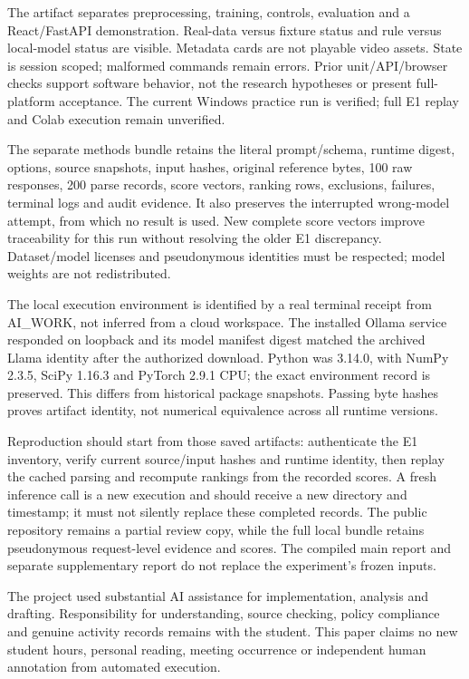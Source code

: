 \documentclass[conference]{IEEEtran}
\begin{document}
The artifact separates preprocessing, training, controls, evaluation and a React/FastAPI demonstration. Real-data versus fixture status and rule versus local-model status are visible. Metadata cards are not playable video assets. State is session scoped; malformed commands remain errors. Prior unit/API/browser checks support software behavior, not the research hypotheses or present full-platform acceptance. The current Windows practice run is verified; full E1 replay and Colab execution remain unverified.

The separate methods bundle retains the literal prompt/schema, runtime digest, options, source snapshots, input hashes, original reference bytes, 100 raw responses, 200 parse records, score vectors, ranking rows, exclusions, failures, terminal logs and audit evidence. It also preserves the interrupted wrong-model attempt, from which no result is used. New complete score vectors improve traceability for this run without resolving the older E1 discrepancy. Dataset/model licenses and pseudonymous identities must be respected; model weights are not redistributed.

The local execution environment is identified by a real terminal receipt from AI\_WORK, not inferred from a cloud workspace. The installed Ollama service responded on loopback and its model manifest digest matched the archived Llama identity after the authorized download. Python was 3.14.0, with NumPy 2.3.5, SciPy 1.16.3 and PyTorch 2.9.1 CPU; the exact environment record is preserved. This differs from historical package snapshots. Passing byte hashes proves artifact identity, not numerical equivalence across all runtime versions.

Reproduction should start from those saved artifacts: authenticate the E1 inventory, verify current source/input hashes and runtime identity, then replay the cached parsing and recompute rankings from the recorded scores. A fresh inference call is a new execution and should receive a new directory and timestamp; it must not silently replace these completed records. The public repository remains a partial review copy, while the full local bundle retains pseudonymous request-level evidence and scores. The compiled main report and separate supplementary report do not replace the experiment's frozen inputs.

The project used substantial AI assistance for implementation, analysis and drafting. Responsibility for understanding, source checking, policy compliance and genuine activity records remains with the student. This paper claims no new student hours, personal reading, meeting occurrence or independent human annotation from automated execution.
\end{document}
